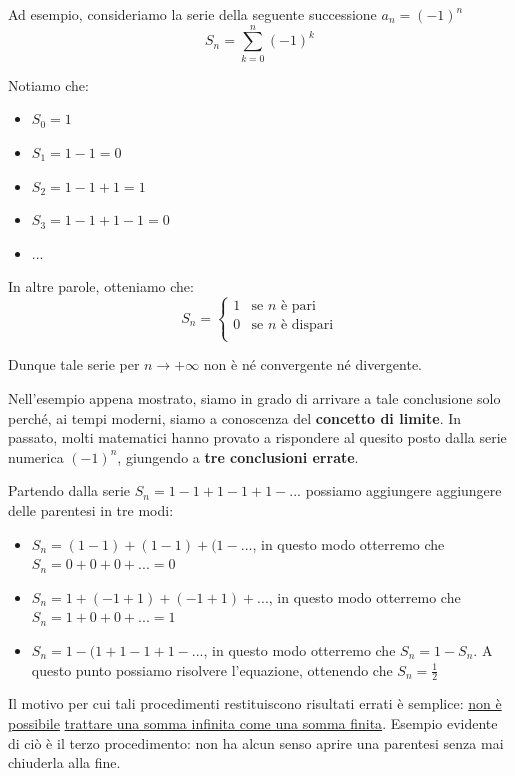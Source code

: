 \documentclass[a4paper, 12pt]{report}
\begin{document}
    Ad esempio, consideriamo la serie della seguente successione $a_n = (-1)^n$
    \[ S_n = \sum_{k=0}^{n} (-1)^k \]
    
    Notiamo che:
    \begin{itemize}
        \item $S_0 = 1$
        \item $S_1 = 1 - 1 = 0$
        \item $S_2 = 1 - 1 + 1 = 1$
        \item $S_3 = 1 - 1 + 1 - 1 = 0$
        \item ...
    \end{itemize}
    
    In altre parole, otteniamo che:
    $$
    S_n = \left \{ \begin{array}{ll}
            1 & \text{se } n \text{ è pari}\\
            0 & \text{se } n \text{ è dispari}\\
        \end{array} \right .
    $$
    
    Dunque tale serie per $n \to +\infty$ non è né convergente né divergente.
    
    Nell'esempio appena mostrato, siamo in grado di arrivare a tale conclusione solo perché, ai tempi moderni, siamo a conoscenza del \textbf{concetto di limite}. In passato, molti matematici hanno provato a rispondere al quesito posto dalla serie numerica $(-1)^n$, giungendo a \textbf{tre conclusioni errate}.
    
    Partendo dalla serie $S_n = 1 - 1 + 1 - 1 + 1 - ...$ possiamo aggiungere aggiungere delle parentesi in tre modi:
    \begin{itemize}
        \item $S_n = (1 - 1) + (1 - 1) + (1 - ...$, in questo modo otterremo che $S_n = 0 + 0 + 0 + ... = 0$
        \item $S_n = 1 +(- 1 + 1) + (-1 + 1) + ...$, in questo modo otterremo che $S_n = 1 + 0 + 0 + ... = 1$
        \item $S_n = 1 - (1 + 1 - 1 + 1 - ...$, in questo modo otterremo che $S_n = 1 - S_n$. A questo punto possiamo risolvere l'equazione, ottenendo che $S_n = \frac{1}{2}$
    \end{itemize}
    
    Il motivo per cui tali procedimenti restituiscono risultati errati è semplice: \underline{non è possibile} \underline{trattare una somma infinita come una somma finita}. Esempio evidente di ciò è il terzo procedimento: non ha alcun senso aprire una parentesi senza mai chiuderla alla fine.
    
\end{document}

